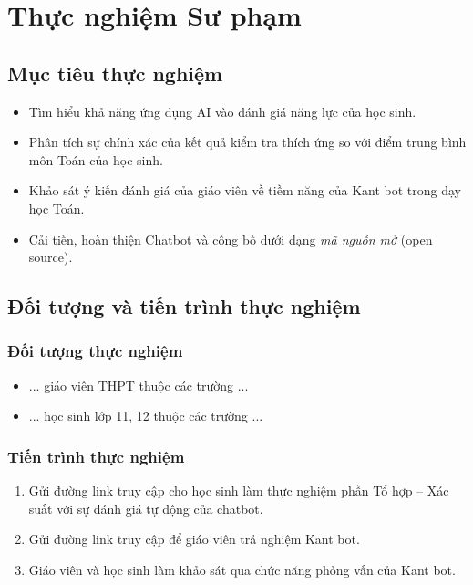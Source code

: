 \chapter{Thực nghiệm Sư phạm}

\section{Mục tiêu thực nghiệm}\begin{itemize}
	\item Tìm hiểu khả năng ứng dụng AI vào đánh giá năng lực của học sinh.
	\item Phân tích sự chính xác của kết quả kiểm tra thích ứng so với điểm trung bình môn Toán của học sinh.
	\item Khảo sát ý kiến đánh giá của giáo viên về tiềm năng của Kant bot trong dạy học Toán.
	\item Cải tiến, hoàn thiện Chatbot và công bố dưới dạng \textit{mã nguồn mở} (open source).
\end{itemize}

\section{Đối tượng và tiến trình thực nghiệm}
\subsection{Đối tượng thực nghiệm}\begin{itemize}
	\item ... giáo viên THPT thuộc các trường ...
	\item ... học sinh lớp 11, 12 thuộc các trường ...
\end{itemize}

\subsection{Tiến trình thực nghiệm}
\begin{enumerate}[label=\textbf{Giai đoạn \arabic*.},align=left,left=0cm..0cm,itemindent=*]
	\item Gửi đường link truy cập cho học sinh làm thực nghiệm phần Tổ hợp – Xác suất với sự đánh giá tự động của chatbot.\par
	\item Gửi đường link truy cập để giáo viên trả nghiệm Kant bot.\par
	\item Giáo viên và học sinh làm khảo sát qua chức năng phỏng vấn của Kant bot.\par
\end{enumerate}


